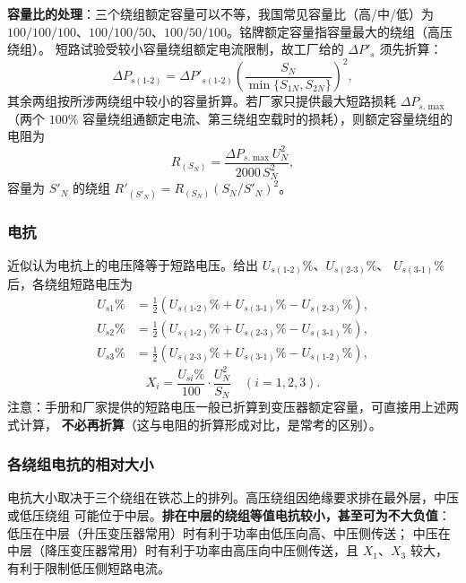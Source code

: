 \textbf{容量比的处理}：三个绕组额定容量可以不等，我国常见容量比（高/中/低）为
$100/100/100$、$100/100/50$、$100/50/100$。铭牌额定容量指容量最大的绕组（高压绕组）。
短路试验受较小容量绕组额定电流限制，故工厂给的 $\Delta P'_{s}$ 须先折算：
\begin{equation}
  \Delta P_{s(1\text{-}2)}=\Delta P'_{s(1\text{-}2)}
  \left(\frac{S_N}{\min\{S_{1N},S_{2N}\}}\right)^{2},
\end{equation}
其余两组按所涉两绕组中较小的容量折算。若厂家只提供最大短路损耗 $\Delta P_{s.\max}$
（两个 $100\%$ 容量绕组通额定电流、第三绕组空载时的损耗），则额定容量绕组的电阻为
\begin{equation}
  R_{(S_N)}=\frac{\Delta P_{s.\max}U_N^{2}}{2000\,S_N^{2}},
\end{equation}
容量为 $S'_N$ 的绕组 $R'_{(S'_N)}=R_{(S_N)}\left(S_N/S'_N\right)^{2}$。

\subsubsection{电抗}

近似认为电抗上的电压降等于短路电压。给出 $U_{s(1\text{-}2)}\%$、$U_{s(2\text{-}3)}\%$、
$U_{s(3\text{-}1)}\%$ 后，各绕组短路电压为
\begin{equation}
  \begin{aligned}
    U_{s1}\%&=\tfrac{1}{2}\left(U_{s(1\text{-}2)}\%+U_{s(3\text{-}1)}\%-U_{s(2\text{-}3)}\%\right),\\
    U_{s2}\%&=\tfrac{1}{2}\left(U_{s(1\text{-}2)}\%+U_{s(2\text{-}3)}\%-U_{s(3\text{-}1)}\%\right),\\
    U_{s3}\%&=\tfrac{1}{2}\left(U_{s(2\text{-}3)}\%+U_{s(3\text{-}1)}\%-U_{s(1\text{-}2)}\%\right),
  \end{aligned}
\end{equation}
\begin{equation}
  X_i=\frac{U_{si}\%}{100}\cdot\frac{U_N^{2}}{S_N}\quad(i=1,2,3).
\end{equation}
注意：手册和厂家提供的短路电压一般已折算到变压器额定容量，可直接用上述两式计算，
\textbf{不必再折算}（这与电阻的折算形成对比，是常考的区别）。

\subsubsection{各绕组电抗的相对大小}

电抗大小取决于三个绕组在铁芯上的排列。高压绕组因绝缘要求排在最外层，中压或低压绕组
可能位于中层。\textbf{排在中层的绕组等值电抗较小，甚至可为不大负值}：
低压在中层（升压变压器常用）时有利于功率由低压向高、中压侧传送；
中压在中层（降压变压器常用）时有利于功率由高压向中压侧传送，且 $X_1$、$X_3$ 较大，
有利于限制低压侧短路电流。


